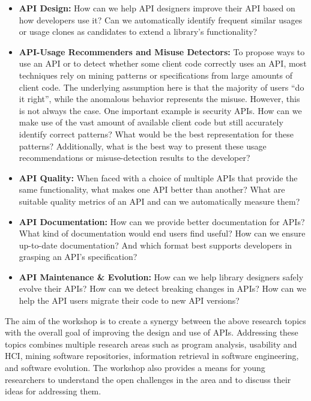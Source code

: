 \documentclass[10pt, conference]{IEEEtran}
\begin{document}
\begin{itemize}
\setlength\itemsep{5pt}

\item \textbf{API Design:} How can we help API designers improve their API based on how developers use it? Can we automatically identify frequent similar usages or usage clones as candidates to extend a library's functionality?

\item \textbf{API-Usage Recommenders and Misuse Detectors:} To propose ways to use an API or to detect whether some client code correctly uses an API, most techniques rely on mining patterns or specifications from large amounts of client code. The underlying assumption here is that the majority of users ``do it right'', while the anomalous behavior represents the misuse. However, this is not always the case. One important example is security APIs. How can we make use of the vast amount of available client code but still accurately identify correct patterns? What would be the best representation for these patterns? Additionally, what is the best way to present these usage recommendations or misuse-detection results to the developer? 

\item \textbf{API Quality:} When faced with a choice of multiple APIs that provide the same functionality, what makes one API better than another? What are suitable quality metrics of an API and can we automatically measure them?

\item\textbf{API Documentation:} How can we provide better documentation for APIs? What kind of documentation would end users find useful? How can we ensure up-to-date documentation? And which format best supports developers in grasping an API's specification?

\item \textbf{API Maintenance \& Evolution:} How can we help library designers safely evolve their APIs? How can we detect breaking changes in APIs? How can we help the API users migrate their code to new API versions?

\end{itemize}

The aim of the workshop is to create a synergy between the above research topics with the overall goal of improving the design and use of APIs. Addressing these topics combines multiple research areas such as program analysis, usability and HCI, mining software repositories, information retrieval in software engineering, and software evolution.
The workshop also provides a means for young researchers to understand the open challenges in the area and to discuss their ideas for addressing them.
\end{document}
